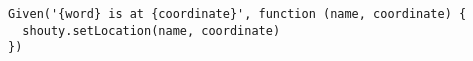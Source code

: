 \begin{verbatim}
Given('{word} is at {coordinate}', function (name, coordinate) {
  shouty.setLocation(name, coordinate)
})
\end{verbatim}
